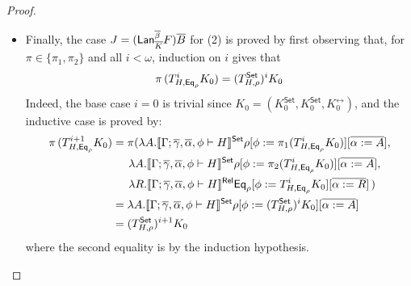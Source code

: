 \documentclass[acmsmall,review,anonymous]{acmart}
\theoremstyle{definition}
\newcommand{\set}{\mathsf{Set}}
\begin{document}
\begin{proof}
\begin{itemize}
\begin{itemize}
\item {\color{blue} Finally, the case $J = (\mathsf{Lan}_{\overline{K}}^{\overline{\beta}}
  F)\overline{B}$ for (2) is proved by first observing that, for $\pi \in
  \{\pi_1,\pi_2\}$ and all $i < \omega$, induction on $i$ gives that
\begin{equation}\label{eq:helper-lan}
\pi\, (T^i_{H,\mathsf{Eq}_{\rho}} K_0) = (T^{\mathsf{Set}}_{H,\rho})^i K_0 
\end{equation}
Indeed, the base case $i=0$ is trivial since $K_0 =
(K^\set_0,K^\set_0,K^\rel_0)$, and the inductive case is proved by:
\begin{align*}
  \pi\, (T^{i+1}_{H,\Eq_{\rho}} K_0) &= \pi(
\lambda A. \oCPOsem{\Gamma;\ol
  \gamma, \ol \alpha, \phi \vdash H}\rho[\phi :=
    \pi_1(T^{i}_{H,\Eq_{\rho}} K_0)][\ol{\alpha := A}],\\
& \hspace*{0.2in} \lambda A. \oCPOsem{\Gamma;\ol
  \gamma, \ol \alpha, \phi \vdash H}\rho[\phi :=
  \pi_2(T^{i}_{H,\Eq_{\rho}} K_0)][\ol{\alpha := A}],\\
&  \hspace*{0.2in} \lambda R. \oCPORsem{\Gamma;\ol
  \gamma, \ol \alpha, \phi \vdash H}\Eq_\rho[\phi :=
  T^{i}_{H,\Eq_{\rho}} K_0][\ol{\alpha := R}] \,) \\
&= \lambda A. \oCPOsem{\Gamma;\ol
  \gamma, \ol \alpha, \phi \vdash H}\rho[\phi :=
   (T^{\oCPO}_{H,\rho})^i K_0][\ol{\alpha := A}]\\
&= (T^\oCPO_{H,\rho})^{i+1} K_0 
\end{align*}
where the second equality is by the induction hypothesis.
}
\end{itemize}
\end{itemize}
\end{proof}
\end{document}
